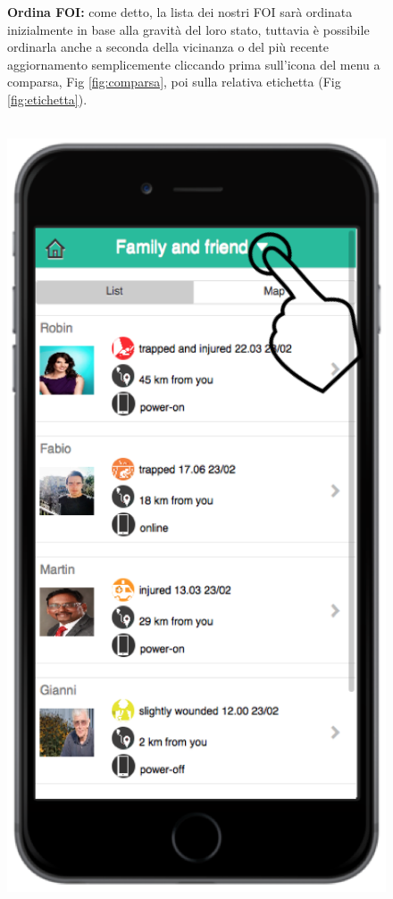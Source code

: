  \begin{figure}
 \textbf{Ordina FOI:} come detto, la lista dei nostri FOI sarà ordinata inizialmente in base alla gravità del loro stato, tuttavia è possibile ordinarla anche a seconda della vicinanza o del più recente aggiornamento semplicemente cliccando prima sull'icona del menu a comparsa, Fig \ref{fig:comparsa}, poi sulla relativa etichetta (Fig \ref{fig:etichetta}).
 \\ \\
 \begin{minipage}[b]{6cm}
   \centering
\includegraphics[scale=0.9]{interfaccia/comparsa.png}

\end{minipage}
\end{figure}
